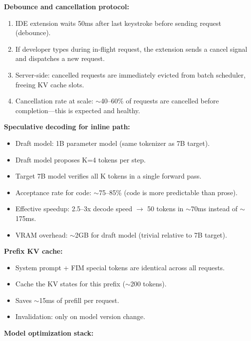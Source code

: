 \textbf{Debounce and cancellation protocol:}

\begin{enumerate}
  \item IDE extension waits 50ms after last keystroke before sending request (debounce).
  \item If developer types during in-flight request, the extension sends a cancel signal and dispatches a new request.
  \item Server-side: cancelled requests are immediately evicted from batch scheduler, freeing KV cache slots.
  \item Cancellation rate at scale: $\sim$40--60\% of requests are cancelled before completion---this is expected and healthy.
\end{enumerate}

\textbf{Speculative decoding for inline path:}

\begin{itemize}
  \item Draft model: 1B parameter model (same tokenizer as 7B target).
  \item Draft model proposes K=4 tokens per step.
  \item Target 7B model verifies all K tokens in a single forward pass.
  \item Acceptance rate for code: $\sim$75--85\% (code is more predictable than prose).
  \item Effective speedup: 2.5--3x decode speed $\rightarrow$ 50 tokens in $\sim$70ms instead of $\sim$175ms.
  \item VRAM overhead: $\sim$2GB for draft model (trivial relative to 7B target).
\end{itemize}

\textbf{Prefix KV cache:}

\begin{itemize}
  \item System prompt + FIM special tokens are identical across all requests.
  \item Cache the KV states for this prefix ($\sim$200 tokens).
  \item Saves $\sim$15ms of prefill per request.
  \item Invalidation: only on model version change.
\end{itemize}

\textbf{Model optimization stack:}

